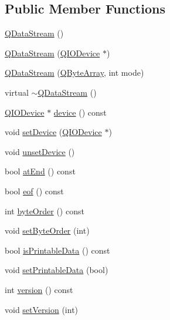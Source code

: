 \subsection*{Public Member Functions}
\begin{DoxyCompactItemize}
\item 
\mbox{\hyperlink{class_q_data_stream_ae8cfdb0d4d326f4bfbc38f8906e00f7b}{Q\+Data\+Stream}} ()
\item 
\mbox{\hyperlink{class_q_data_stream_a267a2b11f97234fe12449e82d03fe652}{Q\+Data\+Stream}} (\mbox{\hyperlink{class_q_i_o_device}{Q\+I\+O\+Device}} $\ast$)
\item 
\mbox{\hyperlink{class_q_data_stream_a0fe70be1e1b5371ea40859c25918f321}{Q\+Data\+Stream}} (\mbox{\hyperlink{class_q_array}{Q\+Byte\+Array}}, int mode)
\item 
virtual \mbox{\hyperlink{class_q_data_stream_a69b54286e9842e39edad381c0e9e6cd6}{$\sim$\+Q\+Data\+Stream}} ()
\item 
\mbox{\hyperlink{class_q_i_o_device}{Q\+I\+O\+Device}} $\ast$ \mbox{\hyperlink{class_q_data_stream_adb4db2f7dc90c1eb08bcbe1707af2266}{device}} () const
\item 
void \mbox{\hyperlink{class_q_data_stream_aa05d0c83cccfb3f193c365c6ee3bb323}{set\+Device}} (\mbox{\hyperlink{class_q_i_o_device}{Q\+I\+O\+Device}} $\ast$)
\item 
void \mbox{\hyperlink{class_q_data_stream_a00d9db572b7ce41ea1a8b321b024acbd}{unset\+Device}} ()
\item 
bool \mbox{\hyperlink{class_q_data_stream_aed16d85107f554048686a6d8d41a4142}{at\+End}} () const
\item 
bool \mbox{\hyperlink{class_q_data_stream_a99e00dc6ee14658c30f58016f5f82e9e}{eof}} () const
\item 
int \mbox{\hyperlink{class_q_data_stream_afe9485a82d0e68105158cfac5ec095bf}{byte\+Order}} () const
\item 
void \mbox{\hyperlink{class_q_data_stream_af15532c2efeaca9f8818fca55a7d7d02}{set\+Byte\+Order}} (int)
\item 
bool \mbox{\hyperlink{class_q_data_stream_a4e80198a5291fbe3ab05c864bc0dbe69}{is\+Printable\+Data}} () const
\item 
void \mbox{\hyperlink{class_q_data_stream_acc3df7d01950ab1a4673019f4f471e8d}{set\+Printable\+Data}} (bool)
\item 
int \mbox{\hyperlink{class_q_data_stream_aefd5c051bac9c9131295d3c6695c673b}{version}} () const
\item 
void \mbox{\hyperlink{class_q_data_stream_afdc50005a7d1651a711a54ec0869a22d}{set\+Version}} (int)

\end{DoxyCompactItemize}
